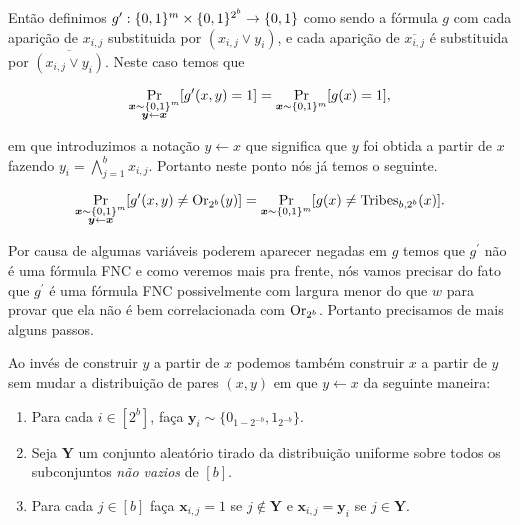 Então definimos $g^{\prime}: \{0, 1\}^{m} \times \{0, 1\}^{2^{b}} \to \{0, 1\}$ como sendo a fórmula $g$ com cada aparição de $x_{i, j}$ substituida por $(x_{i, j} \lor y_{i})$, e cada aparição de $\overline{x_{i, j}}$ é substituida por $\overline{(x_{i, j} \lor y_{i})}$. Neste caso temos que

\begin{equation*}
    \Pr_{ \substack{\boldsymbol{x} \sim \{0, 1\}^{m} \\ \boldsymbol{y} \leftarrow \boldsymbol{x}} }[g^{\prime}(x, y) = 1] = \Pr_{\boldsymbol{x} \sim \{0, 1\}^{m}}[g(x) = 1],
\end{equation*}

em que introduzimos a notação $y \leftarrow x$ que significa que $y$ foi obtida a partir de $x$ fazendo $y_{i} = \bigwedge_{j = 1}^{b} x_{i, j}$. Portanto neste ponto nós já temos o seguinte.

\begin{equation*} \label{correlation_equality}
    \Pr_{ \substack{\boldsymbol{x} \sim \{0, 1\}^{m} \\ \boldsymbol{y} \leftarrow \boldsymbol{x}} }[g^{\prime}(x, y) \neq \text{Or}_{2^{b}}(y)] = \Pr_{\boldsymbol{x} \sim \{0, 1\}^{m}}[g(x) \neq \text{Tribes}_{b, 2^{b}}(x)].
\end{equation*}

Por causa de algumas variáveis poderem aparecer negadas em $g$ temos que $g^{\prime}$ não é uma fórmula FNC e como veremos mais pra frente, nós vamos precisar do fato que $g^{\prime}$ é uma fórmula FNC possivelmente com largura menor do que $w$ para provar que ela não é bem correlacionada com $\text{Or}_{2^{b}}$. Portanto precisamos de mais alguns passos.

Ao invés de construir $y$ a partir de $x$ podemos também construir $x$ a partir de $y$ sem mudar a distribuição de pares $(x, y)$ em que $y \leftarrow x$ da seguinte maneira:

\begin{enumerate}

	\item Para cada $i \in [2^{b}]$, faça $\boldsymbol{y}_{i} \sim \{0_{1 - 2^{-b}}, 1_{2^{-b}}\}$.
	
	\item Seja $\boldsymbol{Y}$ um conjunto aleatório tirado da distribuição uniforme sobre todos os subconjuntos \emph{não vazios} de $[b]$.
	
	\item Para cada $j \in [b]$ faça $\boldsymbol{x}_{i, j} = 1$ se $j \not\in \boldsymbol{Y}$ e $\boldsymbol{x}_{i, j} = \boldsymbol{y}_{i}$ se $j \in \boldsymbol{Y}$.

\end{enumerate}

